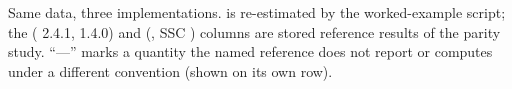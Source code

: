 \begin{table}[!ht]
\centering\scriptsize
\begingroup
\setlength{\tabcolsep}{3pt}

\endgroup
\caption{Same data, three implementations. \statspai{} is re-estimated by
the worked-example script; the  ( 2.4.1,
 1.4.0) and  (, SSC
) columns are stored reference results of the parity study. ``---'' marks a quantity the named
reference does not report or computes under a different convention
(shown on its own row).}
\label{tab:ex08-three-way}
\end{table}
